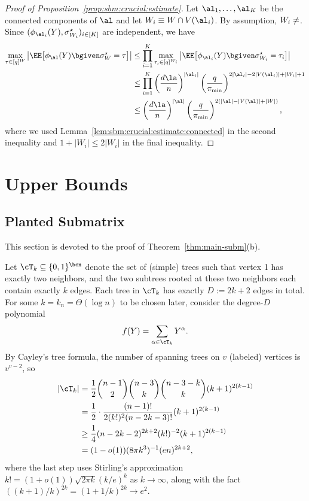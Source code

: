 \documentclass[11pt]{article}
\begin{document}
\begin{proof}[Proof of Proposition~\ref{prop:sbm:crucial:estimate}]
Let $\al_1,\ldots, \al_K$ be the connected components of $\al$ and let $W_i\equiv W\cap V(\al_i)$. By assumption, $W_i\neq \empty$. Since $(\phi_{\al_i}(Y), \sigma^\star_{W_i})_{i\in [K]}$ are independent, we have
\[
\begin{split}
\max_{\tau\in [q]^W}\left|\EE\big[\phi_{\al}(Y)\bgiven \sigma^\star_W=\tau\big]\right|
&\leq \prod_{i=1}^{K}\max_{\tau_i\in [q]^{W_i}}\left|\EE\big[\phi_{\al_i}(Y)\bgiven \sigma^\star_{W_i}=\tau_i\big]\right|\\
&\leq \prod_{i=1}^{K}\left(\frac{d\la}{n}\right)^{|\al_i|}\left(\frac{q}{\pi_{\min}}\right)^{2|\al_i|-2|V(\al_i)|+|W_i|+1}\\
&\leq \left(\frac{d\la}{n}\right)^{|\al|}\left(\frac{q}{\pi_{\min}}\right)^{2(|\al|-|V(\al)|+|W|)},
\end{split}
\]
where we used Lemma~\ref{lem:sbm:crucial:estimate:connected} in the second inequality and $1+|W_i|\leq 2|W_i|$ in the final inequality.
\end{proof}




\section{Upper Bounds}
\label{sec:upper}



\subsection{Planted Submatrix}
\label{sec:subm-upper}

This section is devoted to the proof of Theorem~\ref{thm:main-subm}(b).

Let $\cT_k \subseteq \{0,1\}^{\bcn}$ denote the set of (simple) trees such that vertex 1 has exactly two neighbors, and the two subtrees rooted at these two neighbors each contain exactly $k$ edges. Each tree in $\cT_k$ has exactly $D := 2k+2$ edges in total. For some $k = k_n = \Theta(\log n)$ to be chosen later, consider the degree-$D$ polynomial
\[ f(Y) = \sum_{\alpha \in \cT_k} Y^\alpha. \]
By Cayley's tree formula, the number of spanning trees on $v$ (labeled) vertices is $v^{v-2}$, so
\begin{align*}
|\cT_k| &= \frac{1}{2} \binom{n-1}{2} \binom{n-3}{k} \binom{n-3-k}{k} (k+1)^{2(k-1)} \\
&= \frac{1}{2} \cdot \frac{(n-1)!}{2(k!)^2(n-2k-3)!} (k+1)^{2(k-1)} \\
&\ge \frac{1}{4}(n-2k-2)^{2k+2} (k!)^{-2} (k+1)^{2(k-1)} \\
&= (1-o(1)) (8\pi k^3)^{-1} (en)^{2k+2},
\end{align*}
where the last step uses Stirling's approximation $k! = (1+o(1)) \sqrt{2\pi k} (k/e)^k$ as $k \to \infty$, along with the fact $((k+1)/k)^{2k} = (1+1/k)^{2k} \to e^2$.
\end{document}
